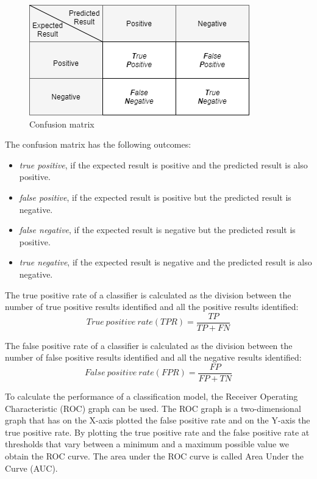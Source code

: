 \documentclass[12pt]{mitthesis}
\begin{document}
\begin{figure}[h]
\centering
\includegraphics[scale=0.9]{confusion.png}
\caption{Confusion matrix}
\label{fig:confusion}
\centering
\end{figure}

The confusion matrix has the following outcomes:
		\begin{itemize}
			\item \textit{true positive}, if the expected result is positive and the predicted result is also positive.
			\item \textit{false positive}, if the expected result is positive but the predicted result is negative.
			\item \textit{false negative}, if the expected result is negative but the predicted result is positive.
			\item \textit{true negative}, if the expected result is negative and the predicted result is also negative.
		\end{itemize}

The true positive rate of a classifier is calculated as the division between the number of true positive results identified and all the positive results identified:
\[ True\ positive\ rate (TPR)
  = \dfrac{TP}{TP+FN}
\]

The false positive rate of a classifier is calculated as the division between the number of false positive results identified and all the negative results identified:
\[ False\ positive\ rate (FPR)
  = \dfrac{FP}{FP+TN}
\]

To calculate the performance of a classification model, the Receiver Operating Characteristic (ROC) graph can be used. The ROC graph is a two-dimensional graph that has on the X-axis plotted the false positive rate and on the Y-axis the true positive rate. By plotting the true positive rate and the false positive rate at thresholds that vary between a minimum and a maximum possible value we obtain the ROC curve. The area under the ROC curve is called Area Under the Curve (AUC).
\end{document}
